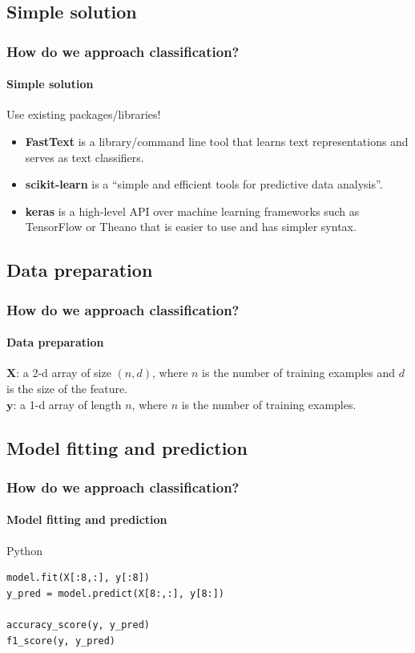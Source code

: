 \documentclass{beamer}
\begin{document}
\subsection{Simple solution}
\begin{frame}
    \frametitle{How do we approach classification?}
    \framesubtitle{Simple solution}
    Use existing packages/libraries!
    \begin{itemize}
        \item \textbf{FastText} is a library/command line tool that learns text representations and serves as text classifiers. 
        \item \textbf{scikit-learn} is a ``simple and efficient tools for predictive data analysis''.
        \item \textbf{keras} is a high-level API over machine learning frameworks such as TensorFlow or Theano that is easier to use and has simpler syntax.
    \end{itemize}
\end{frame}

\subsection{Data preparation}
\begin{frame}
    \frametitle{How do we approach classification?}
    \framesubtitle{Data preparation}
    $\mathbf{X}$: a 2-d array of size $(n, d)$, where $n$ is the number of training examples and $d$ is the size of the feature.\\
    $\mathbf{y}$: a 1-d array of length $n$, where $n$ is the number of training examples.
\end{frame}

\subsection{Model fitting and prediction}
\begin{frame}[containsverbatim]
    \frametitle{How do we approach classification?}
    \framesubtitle{Model fitting and prediction}
    \begin{block}{Python}
        \tiny
        \begin{lstlisting}
model.fit(X[:8,:], y[:8])
y_pred = model.predict(X[8:,:], y[8:])

accuracy_score(y, y_pred)
f1_score(y, y_pred)
        \end{lstlisting}
    \end{block}
\end{frame}
\end{document}
